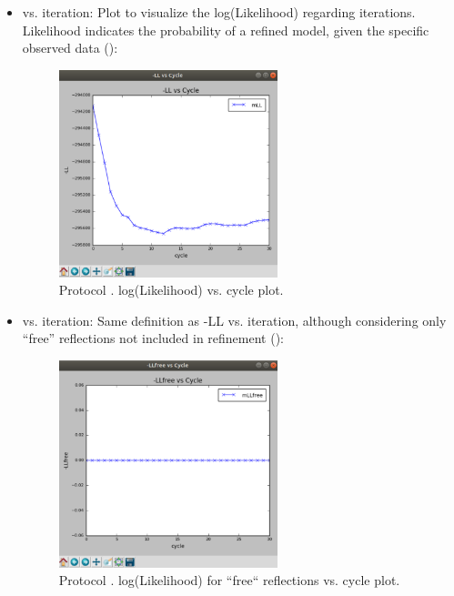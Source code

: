 \begin{itemize}
\begin{itemize}
     \item {} vs. iteration:
     Plot to visualize the log(Likelihood) regarding iterations. Likelihood indicates the probability of a refined model, given the specific observed data  ():
        \begin{figure}[H]
         \centering 
         \captionsetup{width=.7\linewidth} 
         \includegraphics[width=0.60\textwidth]{Images_appendix/Fig135.pdf}
         \caption{Protocol . log(Likelihood) vs. cycle plot.}
         \label{fig:app_protocol_refmac_10}
        \end{figure}
     \item {} vs. iteration:
     Same definition as -LL vs. iteration, although considering only ``free'' reflections not included in refinement
     ():
        \begin{figure}[H]
         \centering 
         \captionsetup{width=.7\linewidth} 
         \includegraphics[width=0.60\textwidth]{Images_appendix/Fig136.pdf}
         \caption{Protocol . log(Likelihood) for ``free`` reflections vs. cycle plot.}

\end{figure}
\end{itemize}
\end{itemize}
